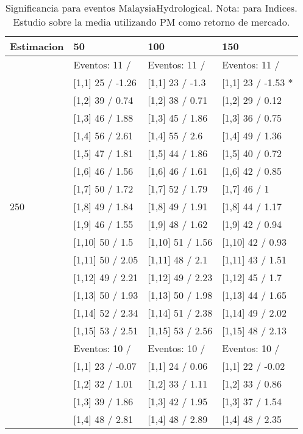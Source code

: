 \begin{table}

\caption{Significancia para eventos MalaysiaHydrological. Nota: para Indices. Estudio sobre la media utilizando PM como retorno de mercado.}
\centering
\begin{tabular}[t]{llll}
\toprule
Estimacion & 50 & 100 & 150\\
\midrule
 & Eventos:  11 / & Eventos:  11 / & Eventos:  11 /\\
 & {}[1,1] 25  / -1.26 & {}[1,1] 23  / -1.3 & {}[1,1] 23  / -1.53 *\\
 & {}[1,2] 39  / 0.74 & {}[1,2] 38  / 0.71 & {}[1,2] 29  / 0.12\\
 & {}[1,3] 46  / 1.88 & {}[1,3] 45  / 1.86 & {}[1,3] 36  / 0.75\\
 & {}[1,4] 56  / 2.61 & {}[1,4] 55  / 2.6 & {}[1,4] 49  / 1.36\\
\addlinespace
 & {}[1,5] 47  / 1.81 & {}[1,5] 44  / 1.86 & {}[1,5] 40  / 0.72\\
 & {}[1,6] 46  / 1.56 & {}[1,6] 46  / 1.61 & {}[1,6] 42  / 0.85\\
 & {}[1,7] 50  / 1.72 & {}[1,7] 52  / 1.79 & {}[1,7] 46  / 1\\
250 & {}[1,8] 49  / 1.84 & {}[1,8] 49  / 1.91 & {}[1,8] 44  / 1.17\\
 & {}[1,9] 46  / 1.55 & {}[1,9] 48  / 1.62 & {}[1,9] 42  / 0.94\\
\addlinespace
 & {}[1,10] 50  / 1.5 & {}[1,10] 51  / 1.56 & {}[1,10] 42  / 0.93\\
 & {}[1,11] 50  / 2.05 & {}[1,11] 48  / 2.1 & {}[1,11] 43  / 1.51\\
 & {}[1,12] 49  / 2.21 & {}[1,12] 49  / 2.23 & {}[1,12] 45  / 1.7\\
 & {}[1,13] 50  / 1.93 & {}[1,13] 50  / 1.98 & {}[1,13] 44  / 1.65\\
 & {}[1,14] 52  / 2.34 & {}[1,14] 51  / 2.38 & {}[1,14] 49  / 2.02\\
\addlinespace
 & {}[1,15] 53  / 2.51 & {}[1,15] 53  / 2.56 & {}[1,15] 48  / 2.13\\
 & Eventos:  10 / & Eventos:  10 / & Eventos:  10 /\\
 & {}[1,1] 23  / -0.07 & {}[1,1] 24  / 0.06 & {}[1,1] 22  / -0.02\\
 & {}[1,2] 32  / 1.01 & {}[1,2] 33  / 1.11 & {}[1,2] 33  / 0.86\\
 & {}[1,3] 39  / 1.86 & {}[1,3] 42  / 1.95 & {}[1,3] 37  / 1.54\\
\addlinespace
 & {}[1,4] 48  / 2.81 & {}[1,4] 48  / 2.89 & {}[1,4] 48  / 2.35\\

\end{tabular}
\end{table}
